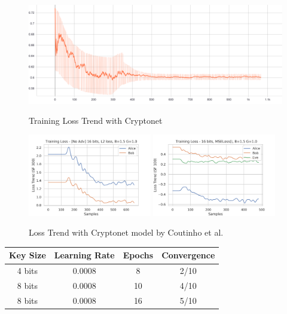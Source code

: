 \documentclass[a4paper]{article}
\begin{document}
  \begin{figure}[H]
    \centering
    \includegraphics[height=2in]{../../models/cryptonet/graphs/TrainingLoss[S].png}
    \caption{Training Loss Trend with Cryptonet}
    \label{fig:trn_crnet}
  \end{figure} 

  \begin{figure}[H]
    \centering
    \includegraphics[width=0.48\textwidth]{../../models/cryptonet/graphs/loss_1E64x256v13.png}
    \includegraphics[width=0.48\textwidth]{../../models/cryptonet/graphs/loss_1E64x256v19.png}
    \caption{Loss Trend with Cryptonet model by Coutinho et al.}
    \label{fig:res_crnet}
  \end{figure}

  \begin{center}
    \begin{tabular}{ c c c c }
      \hline
      \textbf{Key Size} & \textbf{Learning Rate} & \textbf{Epochs} & \textbf{Convergence} \\ \hline
      4 bits            & 0.0008                 & 8               & 2/10                 \\
      8 bits            & 0.0008                 & 10              & 4/10                 \\
      8 bits            & 0.0008                 & 16              & 5/10                 \\
      \hline
    \end{tabular}
  \end{center}
\end{document}
